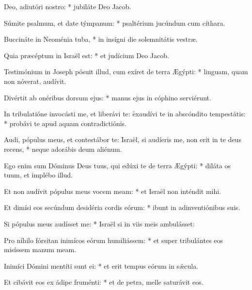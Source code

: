 \begin{psalmus}

 Deo, adiutóri nostro: * jubiláte Deo Jacob.

Súmite psalmum, et date týmpanum: * psaltérium jucúndum cum cíthara.

Buccináte in Neoménia tuba, * in insígni die solemnitátis vestræ.

Quia præcéptum in Israël est: * et judícium Deo Jacob.

Testimónium in Joseph pósuit illud, cum exíret de terra Ægýpti: * linguam, quam non nóverat, audívit.

Divértit ab onéribus dorsum ejus: * manus ejus in cóphino serviérunt.

In tribulatióne invocásti me, et liberávi te: \f exaudívi te in abscóndito tempestátis: * probávi te apud aquam contradictiónis.

Audi, pópulus meus, et contestábor te: \f Israël, si audíeris me, non erit in te deus recens, * neque adorábis deum aliénum.

Ego enim sum Dóminus Deus tuus, qui edúxi te de terra Ægýpti: * diláta os tuum, et implébo illud.

Et non audívit pópulus meus vocem meam: * et Israël non inténdit mihi.

Et dimísi eos secúndum desidéria cordis eórum: * ibunt in adinventiónibus suis.

Si pópulus meus audísset me: * Israël si in viis meis ambulásset:

Pro níhilo fórsitan inimícos eórum humiliássem: * et super tribulántes eos misíssem manum meam.

Inimíci Dómini mentíti sunt ei: * et erit tempus eórum in sǽcula.

Et cibávit eos ex ádipe fruménti: * et de petra, melle saturávit eos.

\end{psalmus}
